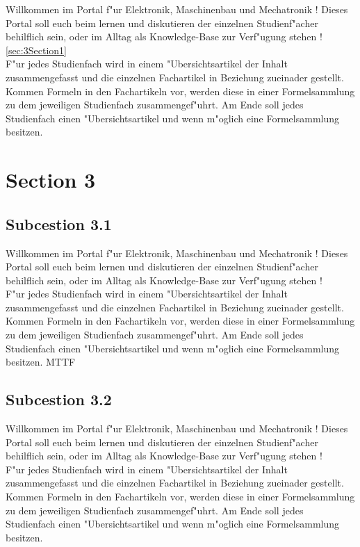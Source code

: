 Willkommen im Portal f"ur Elektronik, Maschinenbau und Mechatronik !
Dieses Portal soll euch beim lernen und diskutieren der einzelnen Studienf"acher behilflich sein, oder im Alltag als Knowledge-Base zur Verf"ugung stehen ! \ref{sec:3Section1} \\
F"ur jedes Studienfach wird in einem "Ubersichtsartikel der Inhalt zusammengefasst und die einzelnen Fachartikel in Beziehung zueinader gestellt. Kommen Formeln in den Fachartikeln vor, werden diese in einer Formelsammlung zu dem jeweiligen Studienfach zusammengef"uhrt. Am Ende soll jedes Studienfach einen "Ubersichtsartikel und wenn m"oglich eine Formelsammlung besitzen.

\section{Section 3}
\label{sec:3Section3}

\subsection{Subcestion 3.1}
\label{subsec:3Subcestion3.1}
Willkommen im Portal f"ur Elektronik, Maschinenbau und Mechatronik !
Dieses Portal soll euch beim lernen und diskutieren der einzelnen Studienf"acher behilflich sein, oder im Alltag als Knowledge-Base zur Verf"ugung stehen ! \\
F"ur jedes Studienfach wird in einem "Ubersichtsartikel der Inhalt zusammengefasst und die einzelnen Fachartikel in Beziehung zueinader gestellt. Kommen Formeln in den Fachartikeln vor, werden diese in einer Formelsammlung zu dem jeweiligen Studienfach zusammengef"uhrt. Am Ende soll jedes Studienfach einen "Ubersichtsartikel und wenn m"oglich eine Formelsammlung besitzen. \acs{MTTF}

\subsection{Subcestion 3.2}
\label{subsec:3Subcestion3.2}
Willkommen im Portal f"ur Elektronik, Maschinenbau und Mechatronik !
Dieses Portal soll euch beim lernen und diskutieren der einzelnen Studienf"acher behilflich sein, oder im Alltag als Knowledge-Base zur Verf"ugung stehen ! \\
F"ur jedes Studienfach wird in einem "Ubersichtsartikel der Inhalt zusammengefasst und die einzelnen Fachartikel in Beziehung zueinader gestellt. Kommen Formeln in den Fachartikeln vor, werden diese in einer Formelsammlung zu dem jeweiligen Studienfach zusammengef"uhrt. Am Ende soll jedes Studienfach einen "Ubersichtsartikel und wenn m"oglich eine Formelsammlung besitzen.

